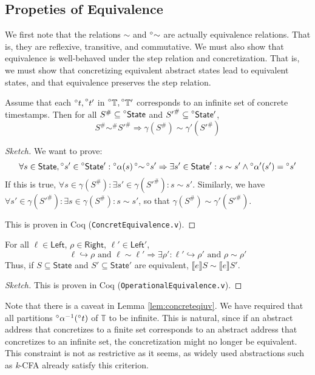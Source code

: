 \documentclass[acmsmall,screen,review]{acmart}\settopmatter{printfolios=true,printccs=false,printacmref=false}
\newcommand*{\A}[1]{\prescript{\circ}{}{#1}}
\newcommand*{\Abs}[1]{{#1}^{\#}}
\newcommand*{\Time}{\mathbb{T}}
\newcommand*{\ATime}{\A{\Time}}
\newcommand*{\Left}{\mathsf{Left}}
\newcommand*{\Right}{\mathsf{Right}}
\newcommand*{\State}{\mathsf{State}}
\newcommand*{\AState}{\A{\mathsf{State}}}
\newcommand*{\semarrow}{\hookrightarrow}
\newcommand*{\equivalent}{\sim}
\newcommand*{\sembracket}[1]{\lBrack{#1}\rBrack}
\begin{document}
\subsection{Propeties of Equivalence}
We first note that the relations $\equivalent$ and $\A\equivalent$ are actually equivalence relations.
That is, they are reflexive, transitive, and commutative.
We must also show that equivalence is well-behaved under the step relation and concretization.
That is, we must show that concretizing equivalent abstract states lead to equivalent states, and that equivalence preserves the step relation.
\begin{lemma}\label{lem:concreteqiuv}
  Assume that each $\A{t},\A{t'}$ in $\ATime,\ATime'$ corresponds to an infinite set of concrete timestamps.
  Then for all $\Abs{S}\subseteq\AState$ and $\Abs{S'}\subseteq\AState'$,
  \[\Abs{S}\Abs\equivalent\Abs{S'}\Rightarrow\gamma(\Abs{S})\equivalent\gamma'(\Abs{S'})\]
\end{lemma}
\begin{proof}[Sketch]
  We want to prove:
  \[\forall s\in\State,\A{s}'\in\AState':\A\alpha(s)\A\equivalent\A{s}'\Rightarrow\exists s'\in\State':s\equivalent s'\land\A\alpha'(s')=\A{s}'\]
  If this is true, $\forall s\in\gamma(\Abs{S}):\exists s'\in\gamma(\Abs{S'}):s\equivalent s'$.
  Similarly, we have $\forall s'\in\gamma(\Abs{S'}):\exists s\in\gamma(\Abs{S}):s\equivalent s'$, so that $\gamma(\Abs{S})\equivalent\gamma'(\Abs{S'})$.

  This is proven in Coq (\texttt{ConcretEquivalence.v}).
\end{proof}
\begin{lemma}
  For all $\ell\in\Left$, $\rho\in\Right$, $\ell'\in\Left'$,
  \[\ell\semarrow\rho\text{ and }\ell\equivalent\ell'\Rightarrow\exists\rho':\ell'\semarrow\rho'\text{ and }\rho\equivalent\rho'\]
  Thus, if $S\subseteq\State$ and $S'\subseteq\State'$ are equivalent, $\sembracket{e}S\equivalent\sembracket{e}S'$.
\end{lemma}
\begin{proof}[Sketch]
  This is proven in Coq (\texttt{OperationalEquivalence.v}).
\end{proof}
Note that there is a caveat in Lemma \ref{lem:concreteqiuv}.
We have required that all partitions $\A\alpha^{-1}(\A{t})$ of $\Time$ to be infinite.
This is natural, since if an abstract address that concretizes to a finite set corresponds to an abstract address that concretizes to an infinite set, the concretization might no longer be equivalent.
This constraint is not as restrictive as it seems, as widely used abstractions such as \emph{k}-CFA already satisfy this criterion.
\end{document}
